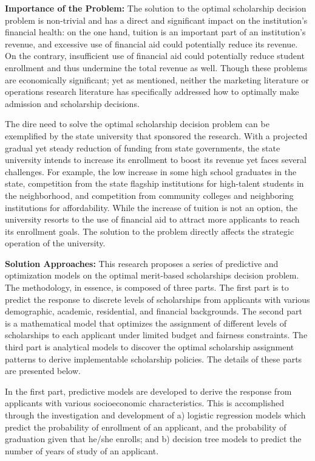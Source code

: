 \documentclass[12pt,english]{report}
\begin{document}
\vspace*{.15in} 
\noindent \textbf{Importance of the Problem:}
The solution to the optimal scholarship decision problem is non-trivial and has
a direct and significant impact on the institution's financial health: on the
one hand, tuition is an important part of an institution's revenue, and
excessive use of financial aid could potentially reduce its revenue. On the
contrary, insufficient use of financial aid could potentially reduce student
enrollment and thus undermine the total revenue as well.  Though these problems
are economically significant; yet as mentioned, neither the marketing
literature or operations research literature has specifically addressed how to
optimally make admission and scholarship decisions.

The dire need to solve the optimal scholarship decision problem can be
exemplified by the state university that sponsored the research.  
With a projected gradual yet steady reduction of funding from state
governments, the state university intends to increase its enrollment to boost
its revenue yet faces several challenges.  For example, the low increase in
some high school graduates in the state, competition from the state flagship
institutions for high-talent students in the neighborhood, and competition from
community colleges and neighboring institutions for affordability.  While the
increase of tuition is not an option,  the university resorts to the use of
financial aid to attract more applicants to reach its enrollment goals.
The solution to the problem directly affects the strategic operation of the
university.

\vspace*{.15in} 
\noindent \textbf{Solution Approaches:} 
This research proposes a series of predictive and optimization models on the
optimal
merit-based scholarships decision problem.  The methodology, in essence, is
composed of three parts. The first part is to predict the response to discrete
levels of scholarships from applicants with various demographic, academic,
residential, and financial backgrounds. The second part is a mathematical 
model that optimizes the assignment of different levels of scholarships to
each applicant under limited budget and fairness constraints. 
The third part is analytical models to discover the optimal scholarship
assignment
patterns to derive implementable scholarship policies. The details
of these parts are presented below.

In the first part, predictive models are developed to derive the response from
applicants with various socioeconomic characteristics. This is accomplished
through the investigation and development of a) logistic regression models
which predict the probability of enrollment of an applicant, and the
probability of graduation given that he/she enrolls; and b) decision tree
models to predict the number of years of study of an applicant.
\end{document}

